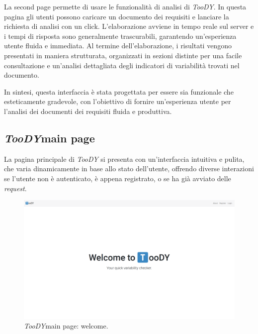 \documentclass[12pt]{report}
\newcommand{\torevise}[1]{\textcolor{red}{#1}}
\newcommand{\toody}{\textsl{TooDY}\xspace}
\begin{document}
La \textsf{second page} permette di usare le funzionalità di analisi di \toody. In questa pagina gli utenti possono caricare un documento dei requisiti e lanciare la richiesta di analisi con un click. L'elaborazione avviene in tempo reale sul server e i tempi di risposta sono generalmente trascurabili, garantendo un'esperienza utente fluida e immediata. Al termine dell'elaborazione, i risultati vengono presentati in maniera strutturata, organizzati in sezioni distinte per una facile consultazione e un'analisi dettagliata degli indicatori di variabilità trovati nel documento.

In sintesi, questa interfaccia è stata progettata per essere sia funzionale che esteticamente gradevole, con l'obiettivo di fornire un'esperienza utente per l'analisi dei documenti dei requisiti fluida e produttiva.


\subsection{\toody \textsf{main page}}
La pagina principale di \toody si presenta con un'interfaccia intuitiva e pulita, che varia dinamicamente in base allo stato dell'utente, offrendo diverse interazioni se l'utente non è autenticato, è appena registrato, o se ha già avviato delle \textit{request}.

\begin{figure}[H]
\centering
\includegraphics[width=1.0\textwidth]{pagina1-welcome.png}
\caption{\toody \textsf{main page}: welcome.}
\label{fig:pagina1-login}
\end{figure}
\end{document}
